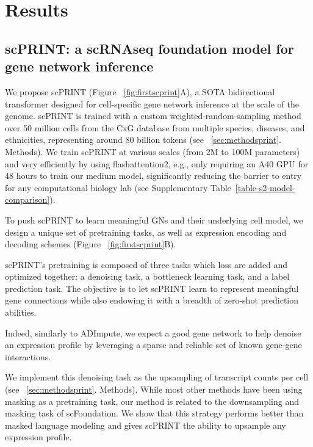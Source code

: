 \section{Results}

\subsection{scPRINT: a scRNAseq foundation model for gene network inference}

We propose \gls{scPRINT} (Figure ~\ref{fig:firstscprint}A), a \gls{SOTA} bidirectional transformer designed for cell-specific gene network inference at the scale of the genome. \gls{scPRINT} is trained with a custom weighted-random-sampling method\citep{jeremiekalfonTrainingFoundationModels} over 50 million cells from the \gls{CxG}\citep{programCZCELLxGENEDiscover2023} database from multiple species, diseases, and ethnicities, representing around 80 billion tokens (see ~\ref{sec:methodsprint}. Methods). We train \gls{scPRINT} at various scales (from 2M to 100M parameters) and very efficiently by using flashattention2\citep{daoFlashAttention2FasterAttention2023}, e.g., only requiring an A40 \gls{GPU} for 48 hours to train our medium model, significantly reducing the barrier to entry for any computational biology lab (see Supplementary Table~\ref{table-s2-model-comparison}).

To push \gls{scPRINT} to learn meaningful \gls{GN}s and their underlying cell model, we design a unique set of pretraining tasks, as well as expression encoding and decoding schemes (Figure ~\ref{fig:firstscprint}B).

\gls{scPRINT}'s pretraining is composed of three tasks which loss are added and optimized together: a denoising task, a bottleneck learning task, and a label prediction task. The objective is to let \gls{scPRINT} learn to represent meaningful gene connections while also endowing it with a breadth of zero-shot prediction abilities.

Indeed, similarly to ADImpute\citep{leoteRegulatoryNetworkbasedImputation2022,eraslanSinglecellRNAseqDenoising2019}, we expect a good gene network to help denoise an expression profile by leveraging a sparse and reliable set of known gene-gene interactions.

We implement this denoising task as the upsampling of transcript counts per cell (see ~\ref{sec:methodsprint}. Methods). While most other methods have been using masking as a pretraining task, our method is related to the downsampling and masking task of scFoundation\citep{haoLargescaleFoundationModel2024}. We show that this strategy performs better than masked language modeling and gives \gls{scPRINT} the ability to upsample any expression profile.

